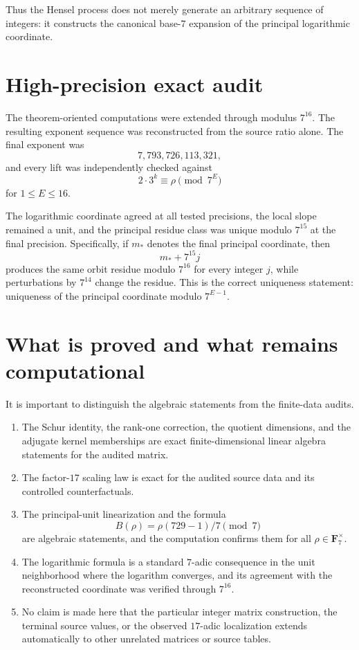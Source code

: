 \documentclass[11pt]{article}
\theoremstyle{definition}
\theoremstyle{remark}
\begin{document}
Thus the Hensel process does not merely generate an arbitrary sequence of integers: it constructs the canonical base-$7$ expansion of the principal logarithmic coordinate.

\section{High-precision exact audit}
The theorem-oriented computations were extended through modulus $7^{16}$. The resulting exponent sequence was reconstructed from the source ratio alone. The final exponent was
\[
7{,}793{,}726{,}113{,}321,
\]
and every lift was independently checked against
\[
2\cdot3^k\equiv\rho\pmod{7^E}
\]
for $1\le E\le16$.

The logarithmic coordinate agreed at all tested precisions, the local slope remained a unit, and the principal residue class was unique modulo $7^{15}$ at the final precision. Specifically, if $m_*$ denotes the final principal coordinate, then
\[
m_*+7^{15}j
\]
produces the same orbit residue modulo $7^{16}$ for every integer $j$, while perturbations by $7^{14}$ change the residue. This is the correct uniqueness statement: uniqueness of the principal coordinate modulo $7^{E-1}$.

\section{What is proved and what remains computational}
It is important to distinguish the algebraic statements from the finite-data audits.

\begin{enumerate}
\item The Schur identity, the rank-one correction, the quotient dimensions, and the adjugate kernel memberships are exact finite-dimensional linear algebra statements for the audited matrix.
\item The factor-$17$ scaling law is exact for the audited source data and its controlled counterfactuals.
\item The principal-unit linearization and the formula
\[
B(\rho)=\rho(729-1)/7\pmod7
\]
are algebraic statements, and the computation confirms them for all $\rho\in\mathbf F_7^\times$.
\item The logarithmic formula is a standard $7$-adic consequence in the unit neighborhood where the logarithm converges, and its agreement with the reconstructed coordinate was verified through $7^{16}$.
\item No claim is made here that the particular integer matrix construction, the terminal source values, or the observed $17$-adic localization extends automatically to other unrelated matrices or source tables.
\end{enumerate}
\end{document}
